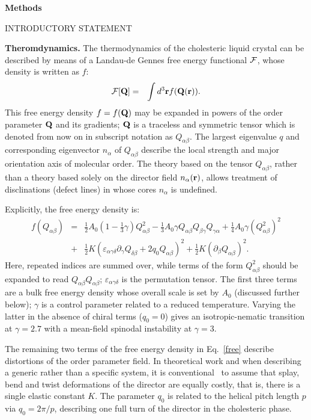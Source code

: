 \documentclass[12pt]{article}
\begin{document}
\bigskip
\noindent
\textbf{\large Methods}

INTRODUCTORY STATEMENT

\noindent
\textbf{Theromdynamics.}
The thermodynamics of the cholesteric liquid crystal can be described
by means of a  Landau-de Gennes free energy functional $\cal F$,
whose density is written as $f$:
\begin{eqnarray}
{\cal F}[{\bf Q}]&=&\int d^3{\bf r} f({\bf Q}({\bf r})).
\end{eqnarray}
This free energy density $f = f({\bf Q})$ may be expanded in powers of the
order parameter ${\bf Q}$ and its gradients; ${\bf Q}$ is a traceless 
and symmetric tensor which is denoted from now on in subscript
notation as $Q_{\alpha\beta}$.
The largest eigenvalue $q$ and corresponding eigenvector $n_\alpha$
of $Q_{\alpha\beta}$ describe the local strength and major orientation axis
of molecular order.
The theory based on the tensor $Q_{\alpha\beta}$, rather than a theory based
solely
on the director field $n_\alpha ({\bf r})$, allows treatment of disclinations
(defect lines) in whose cores $n_\alpha$ is undefined.

Explicitly, the free energy density is:
\begin{eqnarray}
f(Q_{\alpha\beta}) &=& {\textstyle \frac{1}{2}} A_0
 \left(1- {\textstyle \frac{1}{3}}\gamma \right)Q^2_{\alpha \beta}
-{\textstyle \frac{1}{3}}A_0\gamma Q_{\alpha \beta} Q_{\beta \gamma}Q_{\gamma \alpha} 
+ {\textstyle \frac{1}{4}} A_0\gamma (Q^2_{\alpha \beta})^2  \nonumber\\
&+& {\textstyle \frac{1}{2}} K(\varepsilon_{\alpha \gamma \delta}
\partial_\gamma Q_{\delta \beta} + 2 q_0 Q_{\alpha \beta})^2
+ {\textstyle \frac{1}{2}} K (\partial_\beta Q_{\alpha \beta})^2.
\label{free}
\end{eqnarray}
Here, repeated indices are summed over, while terms of the form
$Q^2_{\alpha\beta}$ should be expanded to read $Q_{\alpha\beta}Q_{\alpha\beta}$;
$\varepsilon_{\alpha\gamma\delta}$ is the permutation tensor.
The first three terms are a bulk free energy density whose overall scale
is set by $A_0$ (discussed further below); $\gamma$ is a control parameter
related to a reduced temperature. Varying the latter in the absence of
chiral terms ($q_0=0$) gives an isotropic-nematic transition at
$\gamma = 2.7$ with a mean-field spinodal instability at $\gamma = 3$.

The remaining two terms of the free energy density in Eq.~\ref{free} describe
distortions of the order parameter field. In theoretical work and when
describing a generic rather than a specific system, it is 
conventional~\cite{mermin,deGennes} to
assume that splay, bend and twist deformations of the director are equally
costly, that is, there is a single elastic constant $K$. The parameter $q_0$
is related to the helical pitch length $p$ via $q_0=2\pi/p$,
describing one full turn of the director in the cholesteric phase.
\end{document}
